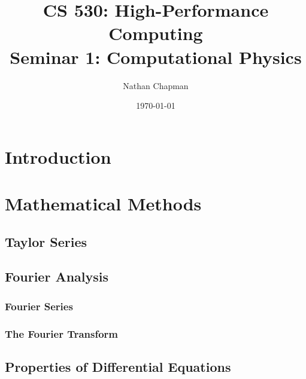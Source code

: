 \documentclass{report}
\title{CS 530: High-Performance Computing \\ Seminar 1: Computational Physics}
\author{Nathan Chapman}
\affil{Department of Computer Science, Central Washington University}
\date{\today}
\begin{document}
\maketitle

\tableofcontents

\chapter{Introduction}


\chapter{Mathematical Methods}

    \section{Taylor Series}

    \section{Fourier Analysis}

        \subsection{Fourier Series}

        \subsection{The Fourier Transform}

    \section{Properties of Differential Equations}
\end{document}
